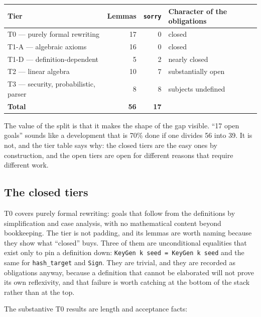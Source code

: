 \begin{center}
\begin{tabular}{@{}lrrl@{}}
\toprule
Tier & Lemmas & \texttt{sorry} & Character of the obligations \\
\midrule
T0 --- purely formal rewriting & 17 & 0 & closed \\
T1-A --- algebraic axioms & 16 & 0 & closed \\
T1-D --- definition-dependent & 5 & 2 & nearly closed \\
T2 --- linear algebra & 10 & 7 & substantially open \\
T3 --- security, probabilistic, parser & 8 & 8 & subjects undefined \\
\midrule
\textbf{Total} & \textbf{56} & \textbf{17} & \\
\bottomrule
\end{tabular}
\end{center}

The value of the split is that it makes the shape of the gap visible. ``17 open
goals'' sounds like a development that is 70\% done if one divides 56 into 39.
It is not, and the tier table says why: the closed tiers are the easy ones by
construction, and the open tiers are open for different reasons that require
different work.

\subsection{The closed tiers}

T0 covers purely formal rewriting: goals that follow from the definitions by
simplification and case analysis, with no mathematical content beyond
bookkeeping. The tier is not padding, and its lemmas are worth naming because
they show what ``closed'' buys. Three of them are unconditional equalities that
exist only to pin a definition down: \texttt{KeyGen\ k\ seed\ =\ KeyGen\ k\ seed}
and the same for \texttt{hash\_target} and \texttt{Sign}. They are trivial, and
they are recorded as obligations anyway, because a definition that cannot be
elaborated will not prove its own reflexivity, and that failure is worth
catching at the bottom of the stack rather than at the top.

The substantive T0 results are length and acceptance facts:

